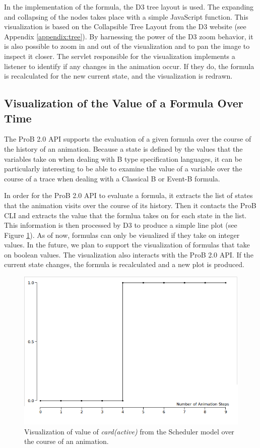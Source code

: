 In the implementation of the formula, the D3 tree layout is used. The expanding and collapsing of the nodes takes place with a simple JavaScript function. This visualization is based on the Collapsible Tree Layout from the D3 website (see Appendix \ref{appendix:tree}). By harnessing the power of the D3 zoom behavior, it is also possible to zoom in and out of the visualization and to pan the image to inspect it closer. The servlet responsible for the visualization implements a listener to identify if any changes in the animation occur. If they do, the formula is recalculated for the new current state, and the visualization is redrawn.

\subsection{Visualization of the Value of a Formula Over Time}

The ProB 2.0 API supports the evaluation of a given formula over the course of the history of an animation.
Because a state is defined by the values that the variables take on when dealing with B type specification languages, it can be particularly interesting to be able to examine the value of a variable over the course of a trace when dealing with a Classical B or Event-B formula. 

In order for the ProB 2.0 API to evaluate a formula, it extracts the list of states that the animation visits over the course of its history. Then it contacts the ProB CLI and extracts the value that the formlua takes on for each state in the list. This information is then processed by D3 to produce a simple line plot (see Figure \ref{timeVsValue}). As of now, formulas can only be visualized if they take on integer values. In the future, we plan to support the visualization of formulas that take on boolean values. The visualization also interacts with the ProB 2.0 API. If the current state changes, the formula is recalculated and a new plot is produced.

\begin{center}
\begin{figure}[h!]
\includegraphics[width=14cm]{bilder/timeVsValue.png}
\caption{Visualization of value of \emph{card(active)} from the Scheduler model over the course of an animation.}
\label{timeVsValue}
\end{figure}
\end{center}

